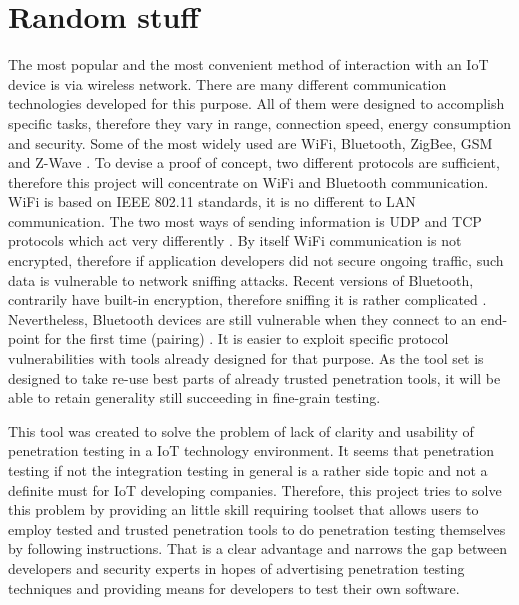 \section{Random stuff}

The most popular and the most convenient method of interaction with an IoT device is via wireless network. There are many different communication technologies developed for this purpose. All of them were designed to accomplish specific tasks, therefore they vary in range, connection speed, energy consumption and security. Some of the most widely used are WiFi, Bluetooth, ZigBee, GSM and Z-Wave \cite{cookbook}. To devise a proof of concept, two different protocols are sufficient, therefore this project will concentrate on WiFi and Bluetooth communication. WiFi is based on IEEE 802.11 standards, it is no different to LAN communication. The two most ways of sending information is UDP and TCP protocols which act very differently \cite{4359944}. By itself WiFi communication is not encrypted, therefore if application developers did not secure ongoing traffic, such data is vulnerable to network sniffing attacks. Recent versions of Bluetooth, contrarily have built-in encryption, therefore sniffing it is rather complicated \cite{scarfone2012guide}. Nevertheless, Bluetooth devices are still vulnerable when they connect to an end-point for the first time (pairing) \cite{scarfone2012guide}. It is easier to exploit specific protocol vulnerabilities with tools already designed for that purpose. As the tool set is designed to take re-use best parts of already trusted penetration tools, it will be able to retain generality still succeeding in fine-grain testing.



This tool was created to solve the problem of lack of clarity and usability of penetration testing in a IoT technology environment. It seems that penetration testing if not the integration testing in general is a rather side topic and not a definite must for IoT developing companies. Therefore, this project tries to solve this problem by providing an little skill requiring toolset that allows users to employ tested and trusted penetration tools to do penetration testing themselves by following instructions. That is a clear advantage and narrows the gap between developers and security experts in hopes of advertising penetration testing techniques and providing means for developers to test their own software.


